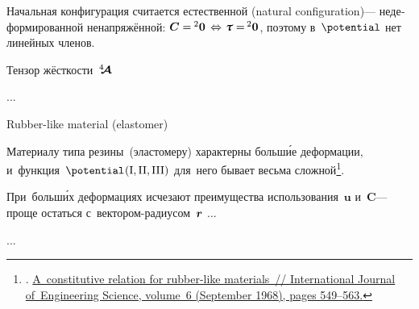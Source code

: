 \begin{otherlanguage}{russian}

\noindent
Начальная конфигурация считается естественной (natural configuration)\:--- недеформированной ненапряжённой: ${\bm{C} = \hspace{-0.1ex} {^2\bm{0}} \hspace{.4ex} \Leftrightarrow \hspace{.2ex} \cauchystress = \hspace{-0.2ex} {^2\bm{0}}}$, поэтому в~$\potential$ нет линейных членов.

Тензор жёсткости~$\hspace{.08ex}{^4\hspace{-0.7ex}\bm{\mathcal{A}}}\hspace{.08ex}$

...

Rubber\hbox{-}like material (elastomer)

Материалу типа резины~(эластомеру) характерны больш\'{и}е деформации, и~функция~${\potential\hspace{.12ex}(\mathrm{I}, \mathrm{II}, \mathrm{III})}$ для~него бывает весьма сложной\footnote{. \href{https://kundoc.com/pdf-a-constitutive-relation-for-rubber-like-materials-.html}{A~constitutive relation for rubber-like ma\-te\-ri\-als~// International Journal of~Engineering Science, volume~6 (September 1968), pages 549\hbox{--}563.}}\hbox{\hspace{-0.5ex}.}

При~больш\'{и}х деформациях исчезают преимущества использования~$\bm{u}$ и~$\bm{C}$\:--- проще остаться с~вектором\hbox{-}радиусом~$\bm{r}$ ...

...



\end{otherlanguage}

\newpage



\label{para:piolakirchhoffstresstensor}

